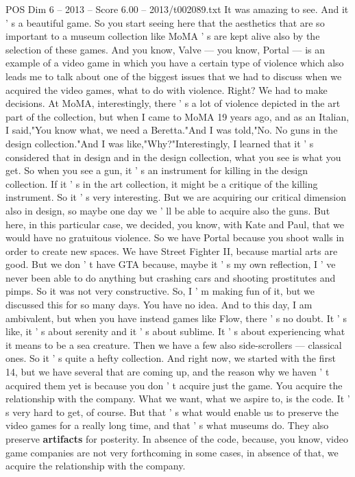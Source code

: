 \begin{textsample}{POS Dim 6 – 2013 – Score 6.00 – 2013/t002089.txt}
It was amazing to see.
And it ' s a beautiful game.
So you start seeing here that the aesthetics that are so important to a museum collection like MoMA ' s are kept alive also by the selection of these games.
And you know, Valve — you know, Portal — is an example of a video game in which you have a certain type of violence which also leads me to talk about one of the biggest issues that we had to discuss when we acquired the video games, what to do with violence.
Right?
We had to make decisions.
At MoMA, interestingly, there ' s a lot of violence depicted in the art part of the collection, but when I came to MoMA 19 years ago, and as an Italian, I said,"You know what, we need a Beretta."And I was told,"No.
No guns in the design collection."And I was like,"Why?"Interestingly, I learned that it ' s considered that in design and in the design collection, what you see is what you get.
So when you see a gun, it ' s an instrument for killing in the design collection.
If it ' s in the art collection, it might be a critique of the killing instrument.
So it ' s very interesting.
But we are acquiring our critical dimension also in design, so maybe one day we ' ll be able to acquire also the guns.
But here, in this particular case, we decided, you know, with Kate and Paul, that we would have no gratuitous violence.
So we have Portal because you shoot walls in order to create new spaces.
We have Street Fighter II, because martial arts are good.
But we don ' t have GTA because, maybe it ' s my own reflection, I ' ve never been able to do anything but crashing cars and shooting prostitutes and pimps.
So it was not very constructive.
So, I ' m making fun of it, but we discussed this for so many days.
You have no idea.
And to this day, I am ambivalent, but when you have instead games like Flow, there ' s no doubt.
It ' s like, it ' s about serenity and it ' s about sublime.
It ' s about experiencing what it means to be a sea creature.
Then we have a few also side-scrollers — classical ones.
So it ' s quite a hefty collection.
And right now, we started with the first 14, but we have several that are coming up, and the reason why we haven ' t acquired them yet is because you don ' t acquire just the game.
You acquire the relationship with the company.
What we want, what we aspire to, is the code.
It ' s very hard to get, of course.
But that ' s what would enable us to preserve the video games for a really long time, and that ' s what museums do.
They also preserve \textbf{artifacts} for posterity.
In absence of the code, because, you know, video game companies are not very forthcoming in some cases, in absence of that, we acquire the relationship with the company.

\end{textsample}
